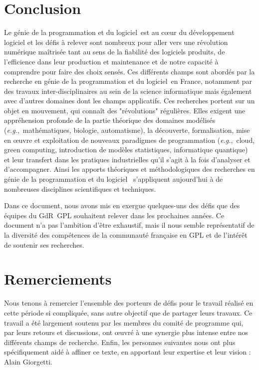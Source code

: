\documentclass[11pt]{article}
\newcommand{\gpl}[0]{génie de la programmation et du logiciel\xspace}
\newcommand{\GDR}{GdR}
\newcommand{\eg}[0]{\emph{e.g.},~}
\begin{document}
\section{Conclusion}
Le \gpl~est au c{\oe}ur du développement logiciel et les défis à relever sont nombreux pour aller vers une révolution numérique  maîtrisée tant au sens de la fiabilité des logiciels produits, de l'efficience dans leur production et maintenance et de notre capacité à comprendre pour faire des choix sensés. Ces différents champs sont abordés par la recherche en \gpl~en France, notamment par des travaux inter-disciplinaires au sein de la science informatique mais également avec d'autres domaines dont les champs applicatifs. 
Ces recherches  portent sur un objet en mouvement, qui connaît des "révolutions" régulières. Elles
exigent une appréhension profonde de la partie théorique des domaines modélisés (\eg mathématiques, biologie, automatisme), la découverte, formalisation, mise en {\oe}uvre et exploitation de nouveaux paradigmes de programmation (\eg  cloud, green computing, introduction de modèles statistiques, informatique quantique) et leur transfert dans les pratiques industrielles qu'il s'agit à la fois d'analyser et d'accompagner. 
Ainsi les apports théoriques et méthodologiques des recherches en \gpl~ s’appliquent aujourd'hui à de nombreuses disciplines scientifiques et techniques.

Dans ce document, nous avons mis en exergue quelques-uns des défis que des
équipes du {\GDR}~GPL souhaitent relever dans les prochaines années. Ce document
n’a pas l’ambition d’être exhaustif, mais il nous semble représentatif de la diversité
des compétences de la communauté française en GPL et de l’intérêt de soutenir ses
recherches.


\section*{Remerciements}
Nous tenons à remercier l'ensemble des porteurs de défis pour le travail réalisé en cette période si compliquée, sans autre objectif que de partager leurs travaux. Ce travail a été largement soutenu par les membres du comité de programme qui, par leurs retours et discussions, ont {\oe}uvré à une synergie plus intense entre nos différents champs de recherche.
Enfin, les personnes suivantes nous ont plus spécifiquement aidé à affiner ce texte, en apportant leur expertise et leur vision : Alain Giorgetti.
\end{document}
